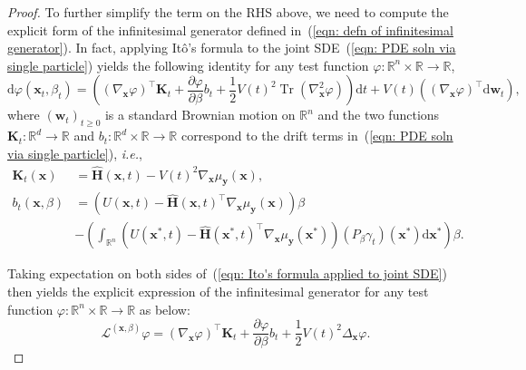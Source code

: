 \documentclass{article}
\numberwithin{equation}{section}
\DeclareMathOperator{\Tr}{Tr}
\def\eqref#1{(\ref{#1})}
\newcommand{\dif}{{\mathrm{d}}}
\def\vw{{\bm{w}}}
\def\vx{{\bm{x}}}
\def\vy{{\bm{y}}}
\def\mH{{\bm{H}}}
\def\mK{{\bm{K}}}
\newcommand{\Ls}{\mathcal{L}}
\begin{document}
\begin{proof}
    To further simplify the term on the RHS above, we need to compute the explicit form of the infinitesimal generator defined in~\eqref{eqn: defn of infinitesimal generator}. In fact, applying It\^{o}'s formula to the joint SDE~\eqref{eqn: PDE soln via single particle} yields the following identity for any test function $\varphi:\mathbb{R}^n \times \mathbb{R} \rightarrow \mathbb{R}$,
    \begin{equation}
    \label{eqn: Ito's formula applied to joint SDE}    
    \dif \varphi(\vx_t,\beta_t) = \left(\left(\nabla_{\vx}\varphi\right)^\intercal \mK_t + \frac{\partial \varphi}{\partial \beta}b_t + \frac{1}{2}V(t)^2\Tr\left(\nabla_{\vx}^2\varphi\right)\right)\dif t + V(t)\left(\left(\nabla_{\vx}\varphi\right)^\intercal\dif\vw_t\right),
    \end{equation}
    where $(\vw_t)_{t\geq 0}$ is a standard Brownian motion on $\mathbb{R}^n$ and the two functions $\mK_t:\mathbb{R}^d \rightarrow \mathbb{R}$ and $b_t:\mathbb{R}^d \times \mathbb{R} \rightarrow \mathbb{R}$ correspond to the drift terms in~\eqref{eqn: PDE soln via single particle}, \emph{i.e.},
    \begin{equation}
    \label{eqn: notation for the sde drifts}
    \begin{aligned}
    \mK_t(\vx) &= \widehat{\mH}(\vx,t)-V(t)^2\nabla_{\vx}\mu_{\vy}(\vx),\\
    b_t(\vx,\beta) &= \left(U(\vx,t) - \widehat{\mH}(\vx,t)^\intercal\nabla_{\vx}\mu_{\vy}(\vx)\right)\beta\\
    &- \left(\int_{\mathbb{R}^n}\left(U(\vx^\ast,t) - \widehat{\mH}(\vx^\ast,t)^\intercal\nabla_{\vx}\mu_{\vy}(\vx^\ast)\right)\left(P_{\beta}\gamma_t\right)(\vx^\ast)\dif \vx^\ast\right)\beta.
    \end{aligned}
    \end{equation}

    Taking expectation on both sides of~\eqref{eqn: Ito's formula applied to joint SDE} then yields the explicit expression of the infinitesimal generator for any test function $\varphi:\mathbb{R}^n \times \mathbb{R} \rightarrow \mathbb{R}$ as below:
    \begin{equation}
    \label{eqn: explicit expression of infinitesimal generator}
    \Ls^{(\vx,\beta)}\varphi = \left(\nabla_{\vx}\varphi\right)^\intercal\mK_t + \frac{\partial \varphi}{\partial \beta}b_t + \frac{1}{2}V(t)^2\Delta_{\vx}\varphi.
    \end{equation}


\end{proof}
\end{document}

